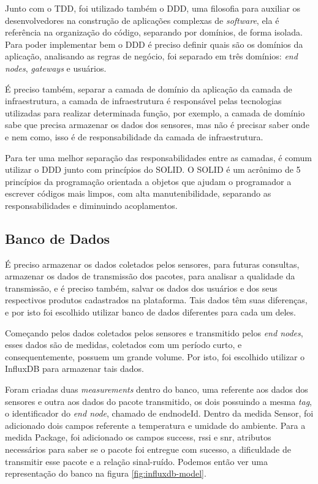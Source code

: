 Junto com o TDD, foi utilizado também o DDD, uma filosofia para auxiliar os desenvolvedores na construção de aplicações complexas de \textit{software}, ela é referência na organização do código, separando por domínios, de forma isolada. Para poder implementar bem o DDD é preciso definir quais são os domínios da aplicação, analisando as regras de negócio, foi separado em três domínios: \textit{end nodes}, \textit{gateways} e usuários.

É preciso também, separar a camada de domínio da aplicação da camada de infraestrutura, a camada de infraestrutura é responsável pelas tecnologias utilizadas para realizar determinada função, por exemplo, a camada de domínio sabe que precisa armazenar os dados dos sensores, mas não é precisar saber onde e nem como, isso é de responsabilidade da camada de infraestrutura.

Para ter uma melhor separação das responsabilidades entre as camadas, é comum utilizar o DDD junto com princípios do SOLID. O SOLID é um acrônimo de 5 princípios da programação orientada a objetos que ajudam o programador a escrever códigos mais limpos, com alta manutenibilidade, separando as responsabilidades e diminuindo acoplamentos.

\subsection{Banco de Dados}
\label{metod:servidor:db}
É preciso armazenar os dados coletados pelos sensores, para futuras consultas, armazenar os dados de transmissão dos pacotes, para analisar a qualidade da transmissão, e é preciso também, salvar os dados dos usuários e dos seus respectivos produtos cadastrados na plataforma. Tais dados têm suas diferenças, e por isto foi escolhido utilizar banco de dados diferentes para cada um deles.
	
Começando pelos dados coletados pelos sensores e transmitido pelos \textit{end nodes}, esses dados são de medidas, coletados com um período curto, e consequentemente, possuem um grande volume. Por isto, foi escolhido utilizar o InfluxDB para armazenar tais dados.

Foram criadas duas \textit{measurements} dentro do banco, uma referente aos dados dos sensores e outra aos dados do pacote transmitido, os dois possuindo a mesma  \textit{tag}, o identificador do \textit{end node}, chamado de endnodeId. Dentro da medida Sensor, foi adicionado dois campos referente a temperatura e umidade do ambiente. Para a medida Package, foi adicionado os campos success, rssi e snr, atributos necessários para saber se o pacote foi entregue com sucesso, a dificuldade de transmitir esse pacote e a relação sinal-ruído. Podemos então ver uma representação do banco na figura \ref{fig:influxdb-model}.

